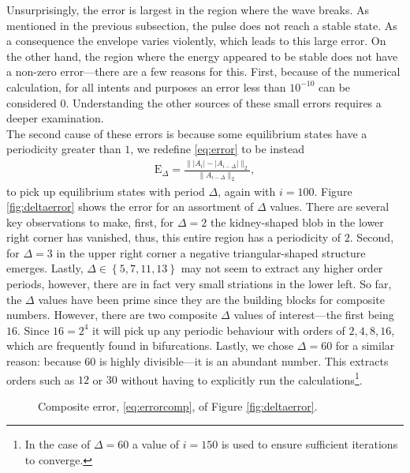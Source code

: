 Unsurprisingly, the error is largest in the region where the wave breaks. As mentioned in the previous subsection, the pulse does not reach a stable state. As a consequence the envelope varies violently, which leads to this large error. On the other hand, the region where the energy appeared to be stable does not have a non-zero error---there are a few reasons for this. First, because of the numerical calculation, for all intents and purposes an error less than $10^{-10}$ can be considered $0$. Understanding the other sources of these small errors requires a deeper examination. \\

The second cause of these errors is because some equilibrium states have a periodicity greater than $1$, we redefine \eqref{eq:error} to be instead
\begin{align}
\textrm{E}_\Delta = \frac{\| |A_i| - |A_{i-\Delta}| \|_2}{\| A_{i-\Delta} \|_2},
\label{eq:deltaerror}
\end{align}
to pick up equilibrium states with period $\Delta$, again with $i = 100$. Figure \ref{fig:deltaerror} shows the error for an assortment of $\Delta$ values. There are several key observations to make, first, for $\Delta = 2$ the kidney-shaped blob in the lower right corner has vanished, thus, this entire region has a periodicity of $2$. Second, for $\Delta = 3$ in the upper right corner a negative triangular-shaped structure emerges. Lastly, $\Delta \in \left\{ 5, 7, 11, 13 \right\}$ may not seem to extract any higher order periods, however, there are in fact very small striations in the lower left. So far, the $\Delta$ values have been prime since they are the building blocks for composite numbers. However, there are two composite $\Delta$ values of interest---the first being $16$. Since $16 = 2^4$ it will pick up any periodic behaviour with orders of $2, 4, 8, 16$, which are frequently found in bifurcations. Lastly, we chose $\Delta = 60$ for a similar reason: because $60$ is highly divisible---it is an abundant number. This extracts orders such as $12$ or $30$ without having to explicitly run the calculations\footnote{In the case of $\Delta = 60$ a value of $i = 150$ is used to ensure sufficient iterations to converge.}. \\

\begin{figure}[tbp]

\caption[Composite error.]{Composite error, \eqref{eq:errorcomp}, of Figure \ref{fig:deltaerror}.}
\label{fig:errorcomp}
\end{figure}

